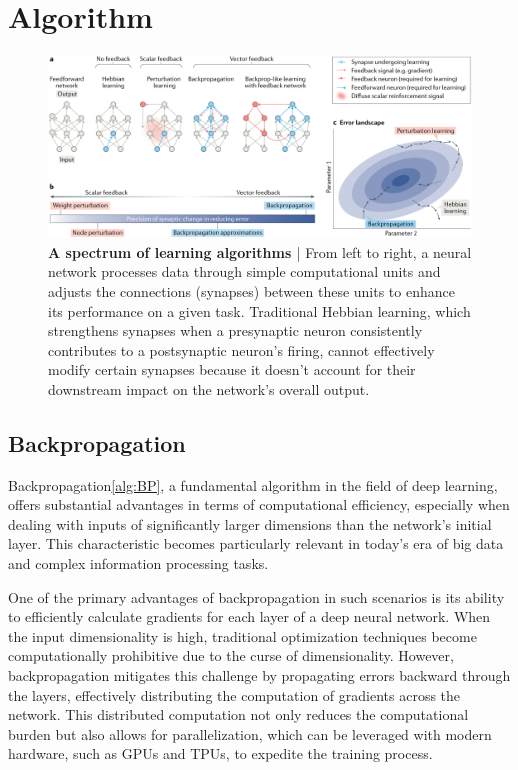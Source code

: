 \documentclass[nohyperref]{article}
\theoremstyle{plain}
\theoremstyle{definition}
\theoremstyle{remark}
\begin{document}
\section{Algorithm}
\begin{figure}[ht]
\vskip 0.2in
\begin{center}
\centerline{\includegraphics[width=2\columnwidth]{images/grad_landscape.png}}
\caption{\textbf{A spectrum of learning algorithms \cite{journe2022hebbian}} | From left to right, a neural network processes data through simple computational units and adjusts the connections (synapses) between these units to enhance its performance on a given task. Traditional Hebbian learning, which strengthens synapses when a presynaptic neuron consistently contributes to a postsynaptic neuron's firing, cannot effectively modify certain synapses because it doesn't account for their downstream impact on the network's overall output.}
\label{grad_landscape}
\end{center}
\vskip -0.2in
\end{figure}

\subsection{Backpropagation}
Backpropagation\cref{alg:BP}, a fundamental algorithm in the field of deep learning, offers substantial advantages in terms of computational efficiency, especially when dealing with inputs of significantly larger dimensions than the network's initial layer. This characteristic becomes particularly relevant in today's era of big data and complex information processing tasks.

One of the primary advantages of backpropagation in such scenarios is its ability to efficiently calculate gradients for each layer of a deep neural network. When the input dimensionality is high, traditional optimization techniques become computationally prohibitive due to the curse of dimensionality. However, backpropagation mitigates this challenge by propagating errors backward through the layers, effectively distributing the computation of gradients across the network. This distributed computation not only reduces the computational burden but also allows for parallelization, which can be leveraged with modern hardware, such as GPUs and TPUs, to expedite the training process.
\end{document}
